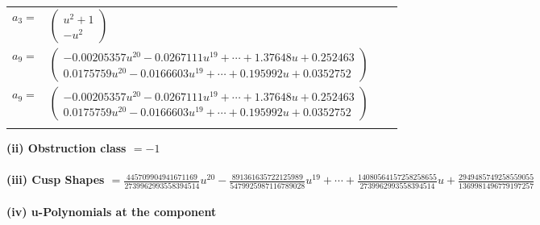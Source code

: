 \documentclass[1p]{elsarticle_modified}
\theoremstyle{definition}
\begin{document}
\begin{tabular}{m{7pt} m{180pt} m{7pt} m{180pt} }
\flushright $a_{3}=$&$\begin{pmatrix}u^2+1\\- u^2\end{pmatrix}$ \\
\flushright $a_{9}=$&$\begin{pmatrix}-0.00205357 u^{20}-0.0267111 u^{19}+\cdots+1.37648 u+0.252463\\0.0175759 u^{20}-0.0166603 u^{19}+\cdots+0.195992 u+0.0352752\end{pmatrix}$\\ \flushright $a_{9}=$&$\begin{pmatrix}-0.00205357 u^{20}-0.0267111 u^{19}+\cdots+1.37648 u+0.252463\\0.0175759 u^{20}-0.0166603 u^{19}+\cdots+0.195992 u+0.0352752\end{pmatrix}$\\&\end{tabular}
\flushleft \textbf{(ii) Obstruction class $= -1$}\\~\\
\flushleft \textbf{(iii) Cusp Shapes $= \frac{445709904941671169}{2739962993558394514} u^{20}-\frac{891361635722125989}{5479925987116789028} u^{19}+\cdots+\frac{14080564157258258655}{2739962993558394514} u+\frac{2949485749258559055}{1369981496779197257}$}\\~\\
\newpage\renewcommand{\arraystretch}{1}
\flushleft \textbf{(iv) u-Polynomials at the component}\newline \\
\end{document}
